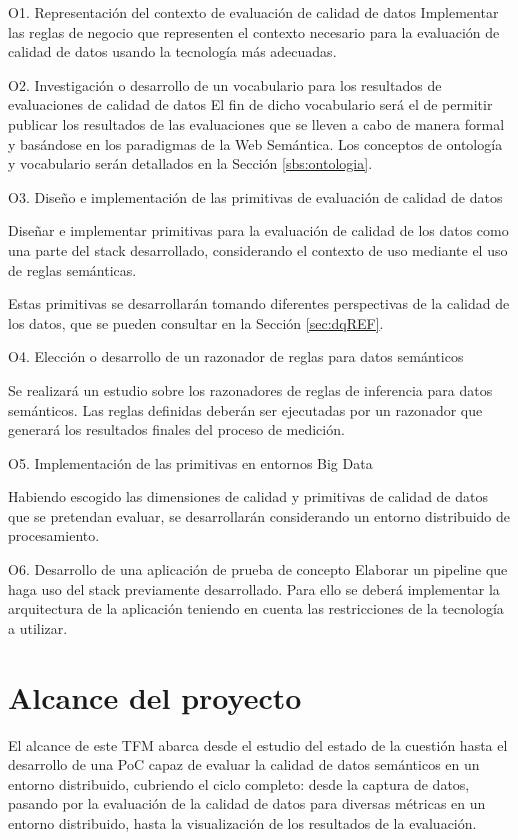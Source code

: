 \begin{definitionlist}
\item[O1. Representación del contexto de evaluación de calidad de datos]
Implementar  las  reglas  de  negocio  que representen el contexto necesario
para la evaluación de
calidad  de datos usando la tecnología más adecuadas.
\label{sec:reglas}

\item[O2. Investigación o desarrollo de un vocabulario para los resultados
  de evaluaciones de calidad de datos]
El fin de dicho vocabulario será el de permitir publicar los
resultados de las evaluaciones que se lleven a cabo de manera formal y basándose
en los paradigmas de la Web Semántica. Los conceptos de ontología y vocabulario
serán detallados en la Sección \ref{sbs:ontologia}. 

\item[O3. Diseño e implementación de las primitivas de evaluación de calidad de datos]

Diseñar e implementar primitivas para la evaluación de calidad de los datos como
una parte del stack desarrollado, considerando el contexto de uso mediante el uso
de reglas semánticas.

Estas primitivas se desarrollarán tomando diferentes perspectivas de la calidad
de los datos, que se pueden consultar en la Sección \ref{sec:dqREF}. 


\item[O4. Elección o desarrollo de un razonador de reglas para datos semánticos]

Se realizará un estudio sobre los razonadores de reglas de inferencia para
datos semánticos. Las reglas definidas deberán ser
ejecutadas por un razonador que generará los resultados finales del proceso de
medición. 

\item[O5. Implementación de las primitivas en entornos Big Data]

Habiendo escogido las dimensiones de calidad y primitivas de calidad de datos
que se pretendan evaluar, se desarrollarán considerando un entorno distribuido
de procesamiento. 

\item[O6. Desarrollo de una aplicación de prueba de concepto]
Elaborar un pipeline que haga uso del stack 
previamente desarrollado. Para ello se deberá implementar la arquitectura de
la aplicación teniendo en cuenta las restricciones de la tecnología a utilizar.

\end{definitionlist}


\section{Alcance del proyecto}

El alcance de este \acs{TFM} abarca desde el estudio del estado de la cuestión
hasta el desarrollo de una \acf{PoC} capaz de evaluar la calidad de datos
semánticos en un entorno distribuido, cubriendo el ciclo completo: desde la
captura de datos, pasando por la evaluación de la calidad de datos para diversas
métricas en un entorno distribuido, hasta la visualización de los resultados de
la evaluación.

